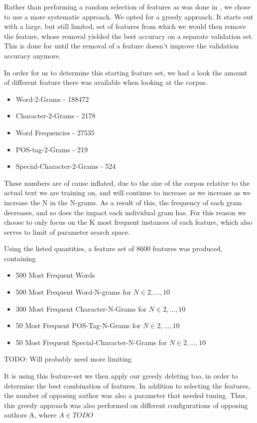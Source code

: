 Rather than performing a random selection of features as was done in \cite{Us},
we chose to use a more systematic approach. We opted for a greedy approach. It
starts out with a large, but still limited, set of features from which we would
then remove the feature, whose removal yielded the best accuracy on a separate
validation set. This is done for until the removal of a feature doesn't
improve the validation accuracy anymore.

In order for us to determine this starting feature set, we had a look the
amount of different feature there was available when looking at the corpus.

\begin{itemize}
    \item Word-2-Grams - 188472
    \item Character-2-Grams - 2178
    \item Word Frequencies - 27535
    \item \gls{POS}-tag-2-Grams - 219
    \item Special-Character-2-Grams - 524
\end{itemize}

These numbers are of cause inflated, due to the size of the corpus relative to
the actual text we are training on, and will continue to increase as we increase
as we increase the N in the N-grams. As a result of this, the frequency of each
gram decreases, and so does the impact each individual gram has.
For this reason we choose to only focus on the K most frequent instances of
each feature, which also serves to limit of parameter search space.

Using the listed quantities, a feature set of 8600 features was produced,
containing

\begin{itemize}
    \item 500 Most Frequent Words
    \item 500 Most Frequent Word-N-grams for $N \in {2,...,10}$
    \item 300 Most Frequent Character-N-Grams for $N \in {2,...,10}$
    \item 50 Most Frequent \gls{POS}-Tag-N-Grams for $N \in {2,...,10}$
    \item 50 Most Frequent Special-Character-N-Grams for $N \in {2,...,10}$
\end{itemize}
TODO: Will probably need more limiting 

It is using this feature-set we then apply our greedy deleting too, in order to
determine the best combination of features.
In addition to selecting the features, the number of opposing author was also
a parameter that needed tuning. Thus, this greedy approach was also performed on
different configurations of opposing authors A, where $A \in TODO$



